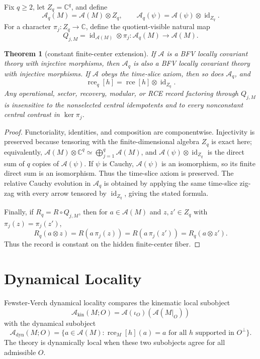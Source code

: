 \documentclass[12pt]{article}
\newtheorem{theorem}{Theorem}
\theoremstyle{remark}
\newcommand{\A}{\mathcal A}
\newcommand{\C}{\mathbb C}
\newcommand{\rce}{\operatorname{rce}}
\begin{document}
Fix \(q\geq 2\), let \(Z_q=\C^q\), and define
\[
  \A_q(M)=\A(M)\otimes Z_q,\qquad
  \A_q(\psi)=\A(\psi)\otimes \operatorname{id}_{Z_q}.
\]
For a character \(\pi_j:Z_q\to\C\), define the quotient-visible natural map
\[
  Q_{j,M}=\operatorname{id}_{\A(M)}\otimes \pi_j:\A_q(M)\to \A(M).
\]

\begin{theorem}[constant finite-center extension]
\label{thm:constant-center}
If \(\A\) is a BFV locally covariant theory with injective morphisms, then
\(\A_q\) is also a BFV locally covariant theory with injective morphisms.  If
\(\A\) obeys the time-slice axiom, then so does \(\A_q\), and
\[
  \rce_q[h]=\rce[h]\otimes \operatorname{id}_{Z_q}.
\]
Any operational, sector, recovery, modular, or RCE record factoring through
\(Q_{j,M}\) is insensitive to the nonselected central idempotents and to every
nonconstant central contrast in \(\ker\pi_j\).
\end{theorem}

\begin{proof}
Functoriality, identities, and composition are componentwise.  Injectivity is
preserved because tensoring with the finite-dimensional algebra \(Z_q\) is
exact here; equivalently, \(\A(M)\otimes \C^q\simeq\bigoplus_{j=1}^q\A(M)\),
and \(\A(\psi)\otimes\operatorname{id}_{Z_q}\) is the direct sum of \(q\)
copies of \(\A(\psi)\).  If \(\psi\) is Cauchy, \(\A(\psi)\) is an isomorphism,
so its finite direct sum is an isomorphism.  Thus the time-slice axiom is
preserved.  The relative Cauchy evolution in \(\A_q\) is obtained by applying
the same time-slice zig-zag with every arrow tensored by
\(\operatorname{id}_{Z_q}\), giving the stated formula.

Finally, if \(R_q=R\circ Q_{j,M}\), then for \(a\in\A(M)\) and
\(z,z'\in Z_q\) with \(\pi_j(z)=\pi_j(z')\),
\[
  R_q(a\otimes z)=R(a\,\pi_j(z))=R(a\,\pi_j(z'))=R_q(a\otimes z').
\]
Thus the record is constant on the hidden finite-center fiber.
\end{proof}

\section{Dynamical Locality}

Fewster-Verch dynamical locality compares the kinematic local subobject
\[
  \A_{\mathrm{kin}}(M;O)=\A(\iota_O)(\A(M|_O))
\]
with the dynamical subobject
\[
  \A_{\mathrm{dyn}}(M;O)
  =
  \{a\in \A(M): \rce_M[h](a)=a
  \text{ for all } h \text{ supported in } O^\perp\}.
\]
The theory is dynamically local when these two subobjects agree for all
admissible \(O\).
\end{document}
